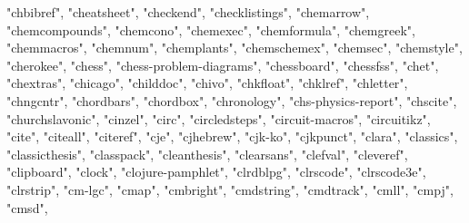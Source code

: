 \documentclass[
]{article}
\newenvironment{Shaded}{\begin{snugshade}}{\end{snugshade}}
\newcommand{\NormalTok}[1]{#1}
\newcommand{\StringTok}[1]{\textcolor[rgb]{0.31,0.60,0.02}{#1}}
\begin{document}
\begin{Shaded}
\begin{Highlighting}[]
\StringTok{"chbibref"}\NormalTok{, }\StringTok{"cheatsheet"}\NormalTok{, }\StringTok{"checkend"}\NormalTok{, }\StringTok{"checklistings"}\NormalTok{, }\StringTok{"chemarrow"}\NormalTok{, }
\StringTok{"chemcompounds"}\NormalTok{, }\StringTok{"chemcono"}\NormalTok{, }\StringTok{"chemexec"}\NormalTok{, }\StringTok{"chemformula"}\NormalTok{, }\StringTok{"chemgreek"}\NormalTok{, }
\StringTok{"chemmacros"}\NormalTok{, }\StringTok{"chemnum"}\NormalTok{, }\StringTok{"chemplants"}\NormalTok{, }\StringTok{"chemschemex"}\NormalTok{, }\StringTok{"chemsec"}\NormalTok{, }
\StringTok{"chemstyle"}\NormalTok{, }\StringTok{"cherokee"}\NormalTok{, }\StringTok{"chess"}\NormalTok{, }\StringTok{"chess{-}problem{-}diagrams"}\NormalTok{, }\StringTok{"chessboard"}\NormalTok{, }
\StringTok{"chessfss"}\NormalTok{, }\StringTok{"chet"}\NormalTok{, }\StringTok{"chextras"}\NormalTok{, }\StringTok{"chicago"}\NormalTok{, }\StringTok{"childdoc"}\NormalTok{, }\StringTok{"chivo"}\NormalTok{, }
\StringTok{"chkfloat"}\NormalTok{, }\StringTok{"chklref"}\NormalTok{, }\StringTok{"chletter"}\NormalTok{, }\StringTok{"chngcntr"}\NormalTok{, }\StringTok{"chordbars"}\NormalTok{, }\StringTok{"chordbox"}\NormalTok{, }
\StringTok{"chronology"}\NormalTok{, }\StringTok{"chs{-}physics{-}report"}\NormalTok{, }\StringTok{"chscite"}\NormalTok{, }\StringTok{"churchslavonic"}\NormalTok{, }
\StringTok{"cinzel"}\NormalTok{, }\StringTok{"circ"}\NormalTok{, }\StringTok{"circledsteps"}\NormalTok{, }\StringTok{"circuit{-}macros"}\NormalTok{, }\StringTok{"circuitikz"}\NormalTok{, }
\StringTok{"cite"}\NormalTok{, }\StringTok{"citeall"}\NormalTok{, }\StringTok{"citeref"}\NormalTok{, }\StringTok{"cje"}\NormalTok{, }\StringTok{"cjhebrew"}\NormalTok{, }\StringTok{"cjk{-}ko"}\NormalTok{, }\StringTok{"cjkpunct"}\NormalTok{, }
\StringTok{"clara"}\NormalTok{, }\StringTok{"classics"}\NormalTok{, }\StringTok{"classicthesis"}\NormalTok{, }\StringTok{"classpack"}\NormalTok{, }\StringTok{"cleanthesis"}\NormalTok{, }
\StringTok{"clearsans"}\NormalTok{, }\StringTok{"clefval"}\NormalTok{, }\StringTok{"cleveref"}\NormalTok{, }\StringTok{"clipboard"}\NormalTok{, }\StringTok{"clock"}\NormalTok{, }\StringTok{"clojure{-}pamphlet"}\NormalTok{, }
\StringTok{"clrdblpg"}\NormalTok{, }\StringTok{"clrscode"}\NormalTok{, }\StringTok{"clrscode3e"}\NormalTok{, }\StringTok{"clrstrip"}\NormalTok{, }\StringTok{"cm{-}lgc"}\NormalTok{, }\StringTok{"cmap"}\NormalTok{, }
\StringTok{"cmbright"}\NormalTok{, }\StringTok{"cmdstring"}\NormalTok{, }\StringTok{"cmdtrack"}\NormalTok{, }\StringTok{"cmll"}\NormalTok{, }\StringTok{"cmpj"}\NormalTok{, }\StringTok{"cmsd"}\NormalTok{, }

\end{Highlighting}
\end{Shaded}
\end{document}
